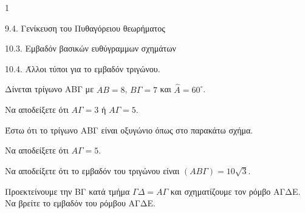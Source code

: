 \begin{ylh}{1}
    \item 9.4. Γενίκευση του Πυθαγόρειου θεωρήματος
    \item 10.3. Εμβαδόν βασικών ευθύγραμμων σχημάτων
    \item 10.4. Άλλοι τύποι για το εμβαδόν τριγώνου.
\end{ylh}
\begin{figure}
\centering
{}
\end{figure}
Δίνεται τρίγωνο ΑΒΓ με $AB = 8$, $B\Gamma = 7$ και $\hat{A} = 60^\circ$.
\begin{alist}
\item Να αποδείξετε ότι $A\Gamma = 3$ ή $A\Gamma = 5$. 
\item Έστω ότι το τρίγωνο ΑΒΓ είναι οξυγώνιο όπως στο παρακάτω σχήμα.
    \begin{rlist}
    \item Να αποδείξετε ότι $A\Gamma = 5$. 
    \item Να αποδείξετε ότι το εμβαδόν του τριγώνου είναι $(AB\Gamma) = 10\sqrt{3}$. 
    \item Προεκτείνουμε την ΒΓ κατά τμήμα $\Gamma\Delta = A\Gamma$ και σχηματίζουμε τον ρόμβο AΓΔE.
    Να βρείτε το εμβαδόν του ρόμβου AΓΔE. 
    \end{rlist}
\end{alist}